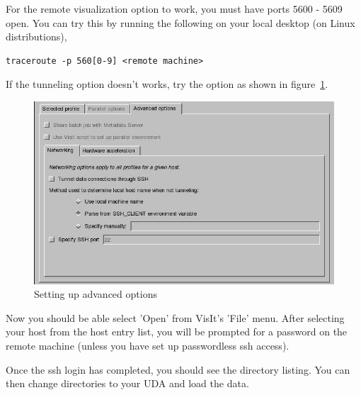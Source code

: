 \documentclass[12pt]{article}
\begin{document}
For the remote visualization option to work, you must have ports 5600
- 5609 open. You can try this by running the following on your local
desktop (on Linux distributions),

\begin{verbatim}
traceroute -p 560[0-9] <remote machine> 
\end{verbatim}

If the tunneling option doesn't works, try the option as shown in
figure~\ref{VisItHostProfileAdv2}.

\begin{figure}
  \center
  \includegraphics[scale=0.5]{VisItHostProfileAdv2.png}
  \caption{Setting up advanced options}
  \label{VisItHostProfileAdv2}
\end{figure}

Now you should be able select 'Open' from VisIt's 'File' menu. After
selecting your host from the host entry list, you will be prompted for
a password on the remote machine (unless you have set up passwordless
ssh access).

Once the ssh login has completed, you should see the directory
listing. You can then change directories to your UDA and load the
data.






\end{document}
